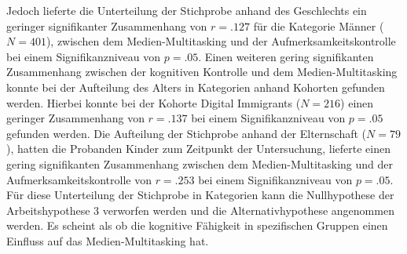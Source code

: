Jedoch lieferte die Unterteilung der Stichprobe anhand des Geschlechts ein geringer signifikanter Zusammenhang von $r=.127$ für die Kategorie Männer ($N=401$), zwischen dem Medien-Multitasking und der Aufmerksamkeitskontrolle bei einem Signifikanzniveau von $p=.05$. Einen weiteren gering signifikanten Zusammenhang zwischen der kognitiven Kontrolle und dem Medien-Multitasking konnte bei der Aufteilung des Alters in Kategorien anhand Kohorten gefunden werden. Hierbei konnte bei der Kohorte Digital Immigrants ($N=216$) einen geringer Zusammenhang von $r=.137$ bei einem Signifikanzniveau von $p=.05$ gefunden werden. Die Aufteilung der Stichprobe anhand der Elternschaft ($N=79$), hatten die Probanden Kinder zum Zeitpunkt der Untersuchung, lieferte einen gering signifikanten Zusammenhang zwischen dem Medien-Multitasking und der Aufmerksamkeitskontrolle von $r=.253$ bei einem Signifikanzniveau von $p=.05$. Für diese Unterteilung der Stichprobe in Kategorien kann die Nullhypothese der Arbeitshypothese 3 verworfen werden und die Alternativhypothese angenommen werden. Es scheint als ob die kognitive Fähigkeit in spezifischen Gruppen einen Einfluss auf das Medien-Multitasking hat.

